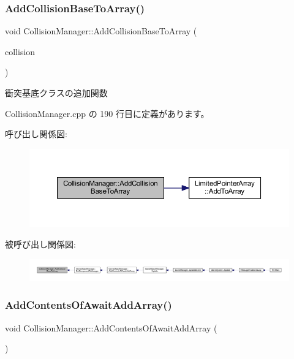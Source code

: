 \subsubsection{\texorpdfstring{Add\+Collision\+Base\+To\+Array()}{AddCollisionBaseToArray()}}
{\footnotesize\ttfamily void Collision\+Manager\+::\+Add\+Collision\+Base\+To\+Array (\begin{DoxyParamCaption}\item[{\mbox{\hyperlink{class_collision_base}{Collision\+Base}} $\ast$}]{collision }\end{DoxyParamCaption})}



衝突基底クラスの追加関数 



 Collision\+Manager.\+cpp の 190 行目に定義があります。

呼び出し関係図\+:\nopagebreak
\begin{figure}[H]
\begin{center}
\leavevmode
\includegraphics[width=350pt]{class_collision_manager_a42be7a26321110f5daaf1828da32f667_cgraph}
\end{center}
\end{figure}
被呼び出し関係図\+:
\nopagebreak
\begin{figure}[H]
\begin{center}
\leavevmode
\includegraphics[width=350pt]{class_collision_manager_a42be7a26321110f5daaf1828da32f667_icgraph}
\end{center}
\end{figure}
\mbox{\label{class_collision_manager_a53e468bb8624f84a5c65c9779781033f}} 
\subsubsection{\texorpdfstring{Add\+Contents\+Of\+Await\+Add\+Array()}{AddContentsOfAwaitAddArray()}}
{\footnotesize\ttfamily void Collision\+Manager\+::\+Add\+Contents\+Of\+Await\+Add\+Array (\begin{DoxyParamCaption}{ }\end{DoxyParamCaption})\hspace{0.3cm}{\ttfamily [private]}}



